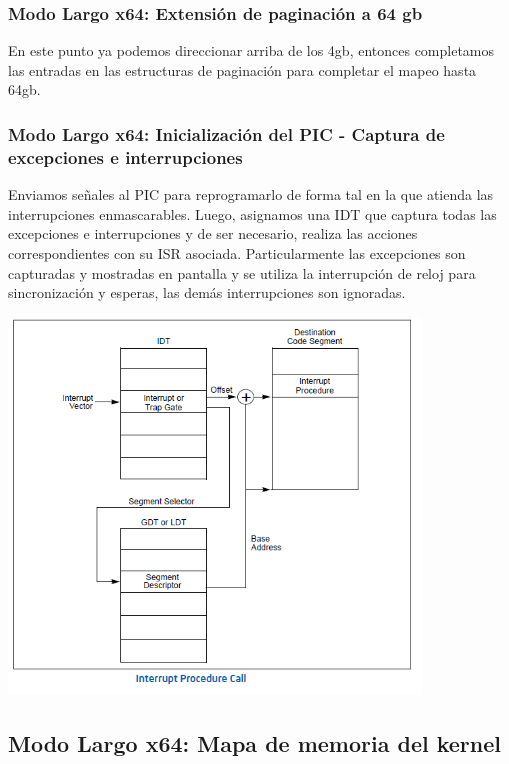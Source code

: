     \subsubsection{Modo Largo x64: Extensión de paginación a 64 gb}

    En este punto ya podemos direccionar arriba de los 4gb, entonces completamos las entradas en las estructuras de paginación para completar el mapeo hasta 64gb.

    \subsubsection{Modo Largo x64: Inicialización del PIC - Captura de excepciones e interrupciones}
	
    Enviamos señales al PIC para reprogramarlo de forma tal en la que atienda las interrupciones enmascarables.
    Luego, asignamos una IDT que captura todas las excepciones e interrupciones y de ser necesario, realiza las acciones correspondientes con su ISR asociada. Particularmente las excepciones son capturadas y mostradas en pantalla y se utiliza la interrupción de reloj para sincronización y esperas, las demás interrupciones son ignoradas.

    \begin{center}
        \includegraphics[height=10cm]{images/interrupts.png}
    \end{center}

\subsection{Modo Largo x64: Mapa de memoria del kernel}

